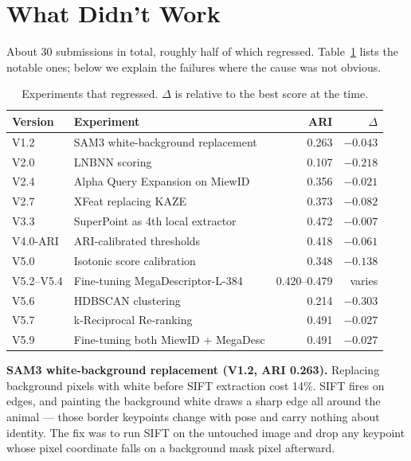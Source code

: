\documentclass[]{ceurart}
\begin{document}
\section{What Didn't Work}
\label{sec:failures}

About 30 submissions in total, roughly half of which regressed.
Table~\ref{tab:regressions} lists the notable ones; below we explain the failures
where the cause was not obvious.

\begin{table}[h]
  \centering
  \caption{Experiments that regressed. $\Delta$ is relative to the best score at the time.}
  \label{tab:regressions}
  \begin{tabular}{llrr}
    \toprule
    \textbf{Version} & \textbf{Experiment} & \textbf{ARI} & \textbf{$\Delta$} \\
    \midrule
    V1.2       & SAM3 white-background replacement     & 0.263 & $-0.043$ \\
    V2.0       & LNBNN scoring                         & 0.107 & $-0.218$ \\
    V2.4       & Alpha Query Expansion on MiewID       & 0.356 & $-0.021$ \\
    V2.7       & XFeat replacing KAZE                  & 0.373 & $-0.082$ \\
    V3.3       & SuperPoint as 4th local extractor     & 0.472 & $-0.007$ \\
    V4.0-ARI   & ARI-calibrated thresholds             & 0.418 & $-0.061$ \\
    V5.0       & Isotonic score calibration            & 0.348 & $-0.138$ \\
    V5.2--V5.4 & Fine-tuning MegaDescriptor-L-384      & 0.420--0.479 & varies \\
    V5.6       & HDBSCAN clustering                    & 0.214 & $-0.303$ \\
    V5.7       & k-Reciprocal Re-ranking               & 0.491 & $-0.027$ \\
    V5.9       & Fine-tuning both MiewID + MegaDesc    & 0.491 & $-0.027$ \\
    \bottomrule
  \end{tabular}
\end{table}

\textbf{SAM3 white-background replacement (V1.2, ARI 0.263).}
Replacing background pixels with white before SIFT extraction cost 14\%.
SIFT fires on edges, and painting the background white draws a sharp edge all
around the animal --- those border keypoints change with pose and carry nothing
about identity. The fix was to run SIFT on the untouched image and drop any
keypoint whose pixel coordinate falls on a background mask pixel afterward.
\end{document}
